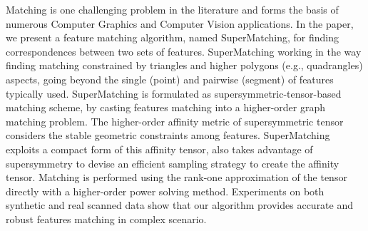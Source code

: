 Matching is one challenging problem in the literature and forms the basis of numerous Computer Graphics and Computer Vision applications. 
In the paper, we present a feature matching algorithm, named SuperMatching, for finding correspondences between two sets of features.
SuperMatching working in the way finding matching constrained by triangles and higher polygons (e.g., quadrangles) aspects, 
going beyond the single (point) and pairwise (segment) of features typically used.
SuperMatching is formulated as supersymmetric-tensor-based matching scheme,
by casting features matching into a higher-order graph matching problem.
The higher-order affinity metric of supersymmetric tensor considers the stable geometric constraints among features.
SuperMatching exploits a compact form of this affinity tensor, also takes advantage of supersymmetry to devise an efficient sampling strategy to create the affinity tensor.
Matching is performed using the rank-one approximation of the tensor directly with a higher-order power solving method.
Experiments on both synthetic and real scanned data show that 
our algorithm provides accurate and robust features matching in complex scenario.
